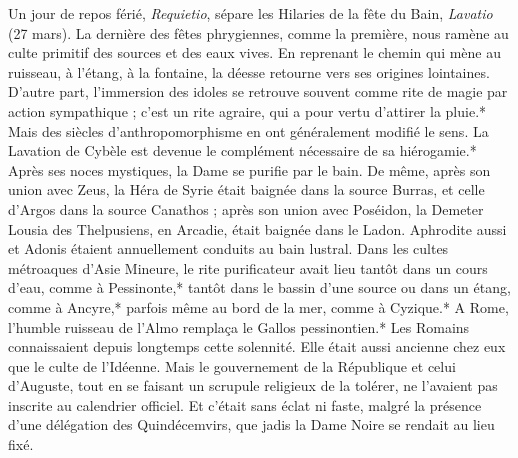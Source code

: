 \documentclass[a4paper, 11pt, oneside, polutonikogreek, french]{article}
\begin{document}
Un jour de repos férié, \emph{Requietio}, sépare les Hilaries de la fête du Bain, \emph{Lavatio} (27 mars). La dernière des fêtes phrygiennes, comme la première, nous ramène au culte primitif des sources et des eaux vives. En reprenant le chemin qui mène au ruisseau, à l'étang, à la fontaine, la déesse retourne vers ses origines lointaines. D'autre part, l'immersion des idoles se retrouve souvent comme rite de magie par action sympathique ; c'est un rite agraire, qui a pour vertu d'attirer la pluie.* Mais des siècles d'anthropomorphisme en ont généralement modifié le sens. La Lavation de Cybèle est devenue le complément nécessaire de sa hiérogamie.* Après ses noces mystiques, la Dame se purifie par le bain. De même, après son union avec Zeus, la Héra de Syrie était baignée dans la source Burras, et celle d'Argos dans la source Canathos ; après son union avec Poséidon, la Demeter Lousia des Thelpusiens, en Arcadie, était baignée dans le Ladon. Aphrodite aussi et Adonis étaient annuellement conduits au bain lustral. Dans les cultes métroaques d'Asie Mineure, le rite purificateur avait lieu tantôt dans un cours d'eau, comme à Pessinonte,* tantôt dans le bassin d'une source ou dans un étang, comme à Ancyre,* parfois même au bord de la mer, comme à Cyzique.* A Rome, l'humble ruisseau de l'Almo remplaça le Gallos pessinontien.* Les Romains connaissaient depuis longtemps cette solennité. Elle était aussi ancienne chez eux que le culte de l'Idéenne. Mais le gouvernement de la République et celui d'Auguste, tout en se faisant un scrupule religieux de la tolérer, ne l'avaient pas inscrite au calendrier officiel. Et c'était sans éclat ni faste, malgré la présence d'une délégation des Quindécemvirs, que jadis la Dame Noire se rendait au lieu fixé.
\end{document}
